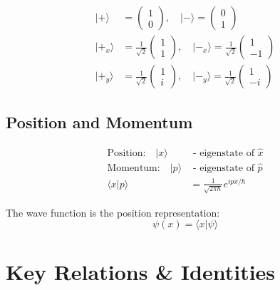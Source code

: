 \documentclass{a3cheatsheet}
\begin{document}
\begin{multicols}{3}
\begin{formulabox}
\begin{align}
|+\rangle &= \begin{pmatrix} 1 \\ 0 \end{pmatrix}, \quad |-\rangle = \begin{pmatrix} 0 \\ 1 \end{pmatrix} \\
|+_x\rangle &= \frac{1}{\sqrt{2}}\begin{pmatrix} 1 \\ 1 \end{pmatrix}, \quad |-_x\rangle = \frac{1}{\sqrt{2}}\begin{pmatrix} 1 \\ -1 \end{pmatrix} \\
|+_y\rangle &= \frac{1}{\sqrt{2}}\begin{pmatrix} 1 \\ i \end{pmatrix}, \quad |-_y\rangle = \frac{1}{\sqrt{2}}\begin{pmatrix} 1 \\ -i \end{pmatrix}
\end{align}
\end{formulabox}

\subsection{Position and Momentum}

\begin{formulabox}
\begin{align}
\text{Position:} \quad |x\rangle &\text{ - eigenstate of } \hat{x} \\
\text{Momentum:} \quad |p\rangle &\text{ - eigenstate of } \hat{p} \\
\langle x|p\rangle &= \frac{1}{\sqrt{2\pi\hbar}} e^{ipx/\hbar}
\end{align}
\end{formulabox}

\begin{notebox}
The wave function is the position representation:
$$\psi(x) = \langle x|\psi\rangle$$
\end{notebox}

\section{Key Relations \& Identities}


\end{multicols}
\end{document}
